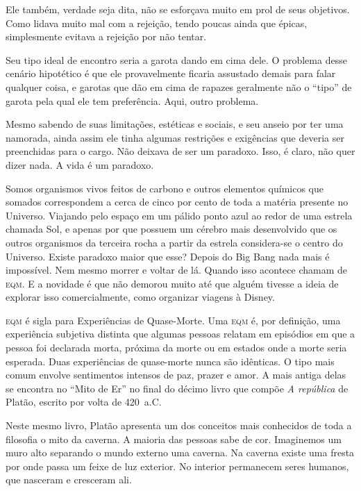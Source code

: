 Ele também, verdade seja dita, não se esforçava muito em prol de seus objetivos. Como lidava muito mal com a rejeição, tendo poucas ainda que épicas, simplesmente evitava a rejeição por não tentar.

Seu tipo ideal de encontro seria a garota dando em cima dele. O problema desse cenário hipotético é que ele provavelmente ficaria assustado demais para falar qualquer coisa, e garotas que dão em cima de rapazes geralmente não  o ``tipo'' de garota pela qual ele tem preferência. Aqui, outro problema.

Mesmo sabendo de suas limitações, estéticas e sociais, e seu anseio por ter uma namorada, ainda assim ele tinha algumas restrições e exigências que deveria ser preenchidas para o cargo. Não deixava de ser um paradoxo. Isso, é claro, não quer dizer nada. A vida é um paradoxo.

Somos organismos vivos feitos de carbono e outros elementos químicos que somados correspondem a cerca de cinco por cento de toda a matéria presente no Universo. Viajando pelo espaço em um pálido ponto azul ao redor de uma estrela chamada Sol, e apenas por que possuem um cérebro mais desenvolvido que os outros organismos da terceira rocha a partir da estrela considera-se o centro do Universo. Existe paradoxo maior que esse? Depois do Big Bang nada mais é impossível. Nem mesmo morrer e voltar de lá. Quando isso acontece\mudanca{,} chamam de \textsc{eqm}. E a novidade é que não demorou muito até que alguém tivesse a ideia de explorar isso comercialmente, como organizar viagens à Disney.

\textsc{eqm} é  sigla para Experiências de Quase-Morte. Uma \textsc{eqm} é, por definição, uma experiência subjetiva distinta que algumas pessoas relatam em episódios em que a pessoa foi declarada morta, próxima da morte ou em estados onde a morte seria esperada. Duas experiências de quase-morte nunca são idênticas. O tipo mais comum envolve sentimentos intensos de paz, prazer e amor. A mais antiga delas se encontra no ``Mito de Er'' no final do décimo livro que compõe \emph{A república} de Platão, escrito por volta de 420~a.C.

Neste mesmo livro, Platão apresenta um dos conceitos  mais conhecidos de toda a filosofia\mudanca{:} o mito da caverna. A maioria das pessoas sabe de cor. Imaginemos um muro alto separando o mundo externo  uma caverna. Na caverna existe uma fresta por onde passa um feixe de luz exterior. No interior\mudanca{,} permanecem seres humanos, que nasceram e cresceram ali.

